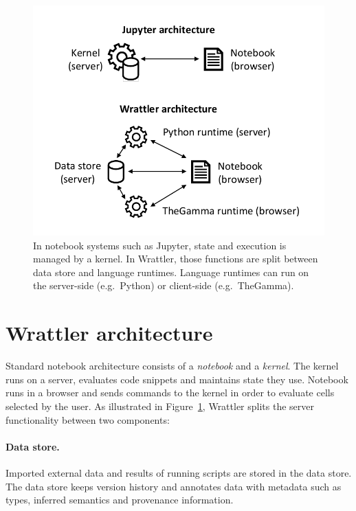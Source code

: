 \documentclass[sigplan]{acmart}\settopmatter{printfolios=true,printccs=false,printacmref=false}
\begin{document}
\begin{figure}[b]
\vspace{-1em}
\includegraphics[scale=0.6]{diagram.pdf}
\vspace{-0.5em}
\caption{\small{In notebook systems such as Jupyter, state and execution is managed by a kernel. In
  Wrattler, those functions are split between data store and language runtimes. Language runtimes 
  can run on the server-side (e.g.~Python) or client-side (e.g.~TheGamma).}}
\label{fig:arch}
\end{figure}

\section{Wrattler architecture}
\label{sec:arch}
Standard notebook architecture consists of a \emph{notebook} and a \emph{kernel}. The kernel
runs on a server, evaluates code snippets and maintains state they use.
Notebook runs in a browser and sends commands to the kernel in order to evaluate 
cells selected by the user. As illustrated in Figure~\ref{fig:arch}, Wrattler splits the 
server functionality between two components:

\paragraph{Data store.} Imported external data and results of running scripts  
are stored in the data store. The data store keeps version history and annotates data with 
metadata such as types, inferred semantics and provenance information.
\end{document}

